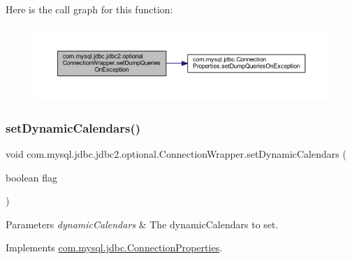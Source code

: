 Here is the call graph for this function\+:
\nopagebreak
\begin{figure}[H]
\begin{center}
\leavevmode
\includegraphics[width=350pt]{classcom_1_1mysql_1_1jdbc_1_1jdbc2_1_1optional_1_1_connection_wrapper_a0e4c6f477c15bd82e03a4376fbef7124_cgraph}
\end{center}
\end{figure}
\mbox{\label{classcom_1_1mysql_1_1jdbc_1_1jdbc2_1_1optional_1_1_connection_wrapper_a0f42541efa793fe1588d0807c2ffab92}} 
\subsubsection{\texorpdfstring{set\+Dynamic\+Calendars()}{setDynamicCalendars()}}
{\footnotesize\ttfamily void com.\+mysql.\+jdbc.\+jdbc2.\+optional.\+Connection\+Wrapper.\+set\+Dynamic\+Calendars (\begin{DoxyParamCaption}\item[{boolean}]{flag }\end{DoxyParamCaption})}


\begin{DoxyParams}{Parameters}
{\em dynamic\+Calendars} & The dynamic\+Calendars to set. \\
\hline
\end{DoxyParams}


Implements \mbox{\hyperlink{interfacecom_1_1mysql_1_1jdbc_1_1_connection_properties_a01fd5822e9a8d49fb51172c50e3d0d31}{com.\+mysql.\+jdbc.\+Connection\+Properties}}.

